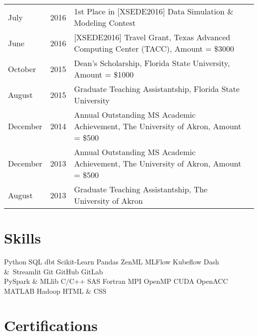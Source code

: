 \documentclass[]{template}
\begin{document}
\begin{tabular}{llll}
\textbullet{} July& 2016	  & 1st Place in [XSEDE2016] Data Simulation \& Modeling Contest  \\

\textbullet{} June & 2016	  & [XSEDE2016] Travel Grant, Texas Advanced Computing Center (TACC), Amount = \$3000\\

\textbullet{} October& 2015	  & Dean's Scholarship, Florida State University, Amount = \$1000\\

\textbullet{} August& 2015	 & Graduate Teaching Assistantship, Florida State University\\

\textbullet{} December& 2014	  & Annual Outstanding MS Academic Achievement, The University of Akron, Amount = \$500\\

\textbullet{} December& 2013	 & Annual Outstanding MS Academic Achievement, The University of Akron, Amount = \$500 \\

\textbullet{} August& 2013	 & Graduate Teaching Assistantship, The University of Akron

\end{tabular}
\sectionsep




\sectionsep
\hline
\sectionsep

\section{Skills}
\begin{minipage}[t]{\textwidth}
Python \textbullet{} SQL \textbullet{} dbt \textbullet{} Scikit-Learn\textbullet{} Pandas \textbullet{} ZenML \textbullet{} MLFlow \textbullet{} Kubeflow \textbullet{} Dash &\ Streamlit \textbullet{} Git \textbullet{} GitHub \textbullet{} GitLab \\
PySpark \& MLlib \textbullet{} C/C++ \textbullet{} SAS \textbullet{} Fortran \textbullet{} MPI \textbullet{} OpenMP   \textbullet{} CUDA \textbullet{} OpenACC   \textbullet{} MATLAB \textbullet{} Hadoop \textbullet{}  HTML \& CSS
\sectionsep
\end{minipage}




\sectionsep
\hline
\sectionsep

\section{Certifications} 
\end{document}
